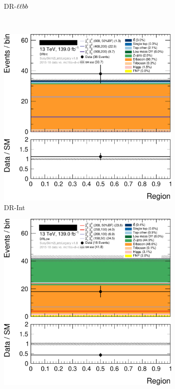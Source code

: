 \begin{figure}[tp]
\begin{subfigure}{0.38\textwidth}
\caption{DR-$\ell\ell bb$}
\end{subfigure}
\\[0.5em]
\begin{subfigure}{0.38\textwidth}
\centering
\includegraphics[width=\textwidth]{figures/2ljets_disco_plot_DRInt.png}
\caption{DR-Int}
\end{subfigure}
\quad\quad
\begin{subfigure}{0.38\textwidth}
\centering
\includegraphics[width=\textwidth]{figures/2ljets_disco_plot_DRLow.png}

\end{subfigure}
\end{figure}
